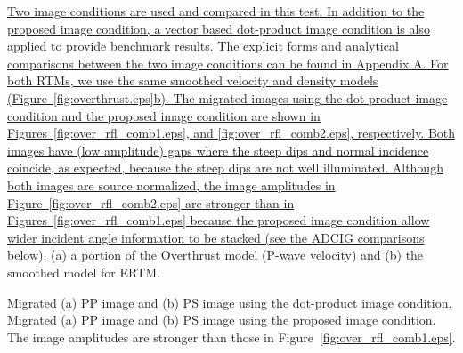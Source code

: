\documentclass[manuscript,ulem,graphix,revised]{geophysics}
\begin{document}
\uline{Two image \marginpar{[1,4,6,13]} conditions are used and compared in this test. In addition to the proposed image condition, a vector based dot-product image condition \mbox{\citep{du17}} is also applied to provide benchmark results. 
The explicit forms and analytical comparisons between the two image conditions can be found in Appendix A. 
For both RTMs, we use the same smoothed velocity and density models (Figure~\ref{fig:overthrust.eps}b).  The migrated images using the dot-product image condition and the proposed image condition are shown in Figures~\ref{fig:over_rfl_comb1.eps}, and \ref{fig:over_rfl_comb2.eps}, respectively. Both images have (low amplitude) gaps where the steep dips and normal incidence coincide, as expected, because the steep dips are not well illuminated. Although both images are source normalized, the image amplitudes in Figure~\ref{fig:over_rfl_comb2.eps} are stronger than in Figures~\ref{fig:over_rfl_comb1.eps} because the proposed image condition allow wider incident angle information to be stacked (see the ADCIG comparisons below).}
{
(a) a portion of the Overthrust model (P-wave velocity) and (b) the smoothed model for ERTM.
}

{
Migrated (a) PP image and (b) PS image using the dot-product image condition.
}
{
Migrated (a) PP image and (b) PS image using the proposed image condition. The image amplitudes are stronger than those in Figure~\ref{fig:over_rfl_comb1.eps}.
}
\end{document}
